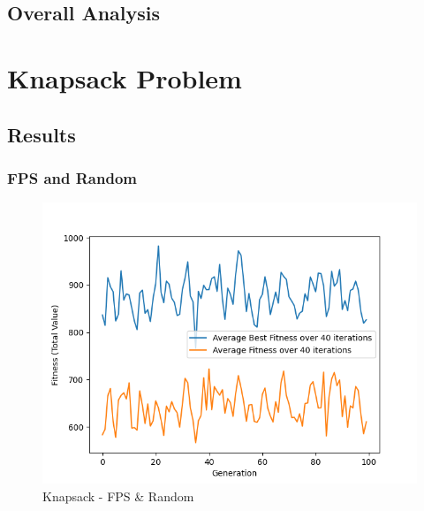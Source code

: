 \documentclass[11pt, letterpaper]{article}
\begin{document}
\subsection {Overall Analysis}

\newpage

\section{Knapsack Problem}

\subsection{Results} 
\subsubsection {FPS and Random}
\begin{figure}[H]
    \centering
    \includegraphics[scale = 0.6]{images/knapsack_fp_rd.png}
    \caption {Knapsack - FPS \& Random}
    \label {fig:kpFR}
\end{figure}
\end{document}
